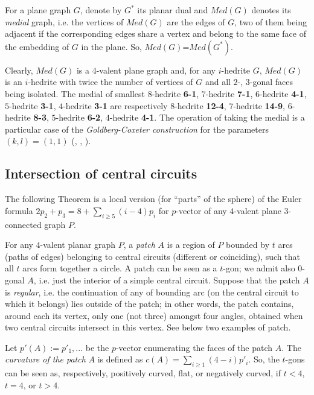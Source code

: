 \documentclass[12pt]{article}
\begin{document}
For a plane graph $G$, denote by $G^*$ its planar dual and {\em $Med(G)$} 
denotes its {\em medial} graph, i.e. the vertices of $Med(G)$ are the edges of 
$G$, two of them being adjacent if the corresponding edges share a vertex and 
belong to the same face of the embedding of $G$ in the plane. 
So, $Med(G)$=$Med(G^*)$.

Clearly, $Med(G)$ is a $4$-valent plane graph and, for any $i$-hedrite $G$,
$Med(G)$ is an $i$-hedrite with twice the number of vertices of $G$ and
all $2$-, $3$-gonal faces being isolated. The medial of smallest
$8$-hedrite {\bf 6-1}, $7$-hedrite {\bf 7-1}, $6$-hedrite {\bf 4-1},
$5$-hedrite {\bf 3-1}, $4$-hedrite {\bf 3-1} are respectively $8$-hedrite
{\bf 12-4}, $7$-hedrite {\bf 14-9}, $6$-hedrite {\bf 8-3},
$5$-hedrite {\bf 6-2}, $4$-hedrite {\bf 4-1}.
The operation of taking the medial is a particular case of the {\em Goldberg-Coxeter construction} for the parameters $(k,l)=(1,1)$ (\cite{Gold37}, \cite{Cox71}, \cite{DD03}).





\subsection{Intersection of central circuits}

The following Theorem is a local version (for ``parts'' of the sphere) of
the Euler formula
$2p_2+p_3=8+ \sum_{i\geq 5} (i-4)p_i$ for $p$-vector of any $4$-valent 
plane $3$-connected graph $P$.

For any $4$-valent planar graph $P$, a {\em patch} $A$ is a region of $P$
bounded by $t$ arcs (paths of edges) belonging to central circuits 
(different or coinciding), such that all $t$ arcs form together a circle. 
A patch can be seen as a $t$-gon; we admit also 
$0$-gonal $A$, i.e. just the interior of a simple central circuit. 
Suppose that the patch $A$ is {\em regular}, i.e.
the continuation of any of bounding arc (on the central circuit to which it
belongs) lies outside of the patch; in other words, the patch
contains, around each its vertex, only one (not three) amongst four angles, 
obtained when two central circuits intersect in this vertex.  See below two 
examples of patch.

\begin{center}
\epsfxsize=60mm
\end{center}

Let $p'(A):=p'_1,...$ be the $p$-vector enumerating the faces of the 
patch $A$. The {\em curvature of the patch} $A$ is defined as
$c(A)=\sum_{i\geq 1} (4-i)p'_i$. So, the $t$-gons can be seen as,
respectively, positively curved, flat, or negatively curved, if
$t<4$, $t=4$, or $t>4$.
\end{document}
